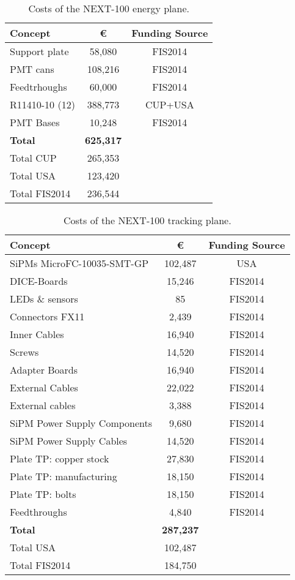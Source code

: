 \begin{table}[h!]
\begin{center}
\begin{tabular}{|l|c|c|}
\hline
 Concept & \euro & Funding Source \\
 \hline
Support plate	&	58,080 &	FIS2014 \\
PMT cans &	108,216 &	FIS2014 \\
Feedtrhoughs &	60,000 & FIS2014 \\
R11410-10 (12) &	388,773	& CUP+USA \\
PMT Bases &		10,248 &	FIS2014 \\
  \hline
{\bf Total}	&	{\bf 625,317}	& \\
Total CUP	&	265,353	&\\
Total USA	&	123,420 & \\
Total FIS2014	&	236,544 & \\	
 \hline\hline
\end{tabular}  
\caption{Costs of the NEXT-100 energy plane.}
\label{tab.n100:EP}
\end{center}
\end{table}

\begin{table}[h!]
\begin{center}
\begin{tabular}{|l|c|c|}
\hline
 Concept & \euro & Funding Source \\
 \hline
SiPMs MicroFC-10035-SMT-GP & 102,487 & USA \\
DICE-Boards &15,246 & FIS2014 \\
LEDs \& sensors &	85 & FIS2014 \\
Connectors FX11 & 2,439 & FIS2014 \\
Inner Cables & 16,940 & FIS2014 \\
Screws	& 14,520 & FIS2014 \\
Adapter Boards	 &	16,940 & FIS2014 \\
External Cables &	22,022 & FIS2014 \\
External cables & 3,388 & FIS2014 \\
SiPM Power Supply Components & 9,680 & FIS2014 \\
SiPM Power Supply Cables &	14,520 & FIS2014 \\
Plate  TP:  copper stock &  27,830 & FIS2014 \\
Plate  TP:  manufacturing & 18,150 & FIS2014 \\
Plate  TP:  bolts & 	18,150 & FIS2014 \\
Feedthroughs & 4,840 & FIS2014 \\
  \hline
{\bf Total}	&	{\bf 287,237 }	& \\
  Total USA	&	102,487 	& \\
   Total FIS2014	&	184,750 	& \\
 \hline\hline
\end{tabular}  
\caption{Costs of the NEXT-100 tracking plane.}
\label{tab.n100:TP}
\end{center}
\end{table} 

